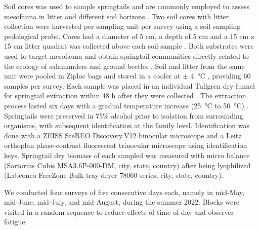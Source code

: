 Soil cores was used to sample springtails and are commonly employed to assess mesofauna in litter and different soil horizons \citep{chauvatChangesSoilFaunal2011a,farskaManagementIntensityAffects2014,pongeVerticalDistributionCollembola2000,salamonEffectsPlantDiversity2004,wuCompositionSpatiotemporalVariation2014}. 
Two soil cores with litter collection were harvested per sampling unit per survey using a soil sampling pedological probe. 
Cores had a diameter of 5 cm, a depth of 5 cm and a 15 cm x 15 cm litter quadrat was collected above each soil sample \citep{raymond-leonardSpringtailCommunityStructure2018a,rousseauForestFloorMesofauna2018}.
Both substrates were used to target mesofauna and obtain springtail communities directly related to the ecology of salamanders and ground beetles \citep{chauvatChangesSoilFaunal2011a,edwardsAssessmentPopulationsSoilinhabiting1991,raymond-leonardSpringtailCommunityStructure2018a,rousseauForestFloorMesofauna2018}.
Soil and litter from the same unit were pooled in Ziploc\up{\texttrademark{}} bags and stored in a cooler at $\pm$ 4 °C \citep{chauvatChangesSoilFaunal2011a,rousseauForestFloorMesofauna2018}, providing 60 samples per survey.
Each sample was placed in an individual Tullgren dry-funnel for springtail extraction within 48 h after they were collected \citep{rousseauForestFloorMesofauna2018,rusekBiodiversityCollembolaTheir1998,wuCompositionSpatiotemporalVariation2014}. 
The extraction process lasted six days with a gradual temperature increase (25 °C to 50 °C) \citep{raymond-leonardSpringtailCommunityStructure2018a}.
Springtails were preserved in 75\% alcohol \citep{wuCompositionSpatiotemporalVariation2014} prior to isolation from surrounding organisms, with subsequent identification at the family level.
Identification was done with a ZEISS SteREO Discovery.V12 binocular microscope and a Leitz orthoplan phase-contrast fluorescent trinocular microscope using \cite{bellingerChecklistCollembolaWorld1996} identification keys.
Springtail dry biomass of each sampled was measured with micro balance (Sartorius Cubis\up{\texttrademark{}} MSA3.6P-000-DM, city, state, country) after being lyophilized (Labconco FreeZone Bulk tray dryer 78060 series, city, state, country).

We conducted four surveys of five consecutive days each, namely in mid-May, mid-June, mid-July, and mid-August, during the summer 2022.
Blocks were visited in a random sequence to reduce effects of time of day and observer fatigue.

\pagebreak

